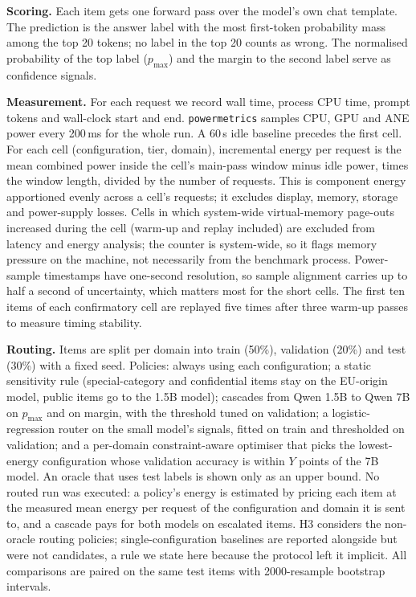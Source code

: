 \documentclass[10pt,twocolumn]{article}
\begin{document}
\textbf{Scoring.} Each item gets one forward pass over the model's own chat template. The prediction is the answer label with the most first-token probability mass among the top 20 tokens; no label in the top 20 counts as wrong. The normalised probability of the top label ($p_{\max}$) and the margin to the second label serve as confidence signals.

\textbf{Measurement.} For each request we record wall time, process CPU time, prompt tokens and wall-clock start and end. \texttt{powermetrics} samples CPU, GPU and ANE power every 200\,ms for the whole run. A 60\,s idle baseline precedes the first cell. For each cell (configuration, tier, domain), incremental energy per request is the mean combined power inside the cell's main-pass window minus idle power, times the window length, divided by the number of requests. This is component energy apportioned evenly across a cell's requests; it excludes display, memory, storage and power-supply losses. Cells in which system-wide virtual-memory page-outs increased during the cell (warm-up and replay included) are excluded from latency and energy analysis; the counter is system-wide, so it flags memory pressure on the machine, not necessarily from the benchmark process. Power-sample timestamps have one-second resolution, so sample alignment carries up to half a second of uncertainty, which matters most for the short cells. The first ten items of each confirmatory cell are replayed five times after three warm-up passes to measure timing stability.

\textbf{Routing.} Items are split per domain into train (50\%), validation (20\%) and test (30\%) with a fixed seed. Policies: always using each configuration; a static sensitivity rule (special-category and confidential items stay on the EU-origin model, public items go to the 1.5B model); cascades from Qwen 1.5B to Qwen 7B on $p_{\max}$ and on margin, with the threshold tuned on validation; a logistic-regression router on the small model's signals, fitted on train and thresholded on validation; and a per-domain constraint-aware optimiser that picks the lowest-energy configuration whose validation accuracy is within $Y$ points of the 7B model. An oracle that uses test labels is shown only as an upper bound. No routed run was executed: a policy's energy is estimated by pricing each item at the measured mean energy per request of the configuration and domain it is sent to, and a cascade pays for both models on escalated items. H3 considers the non-oracle routing policies; single-configuration baselines are reported alongside but were not candidates, a rule we state here because the protocol left it implicit. All comparisons are paired on the same test items with 2000-resample bootstrap intervals.
\end{document}
